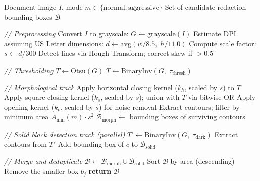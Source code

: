 \begin{algorithm}[t]
  \caption{Redaction Region Detection}
  \label{alg:redaction_detection}
\begin{minipage}{\columnwidth}
\begin{algorithmic}
   Document image $I$, mode $m \in \{\text{normal}, \text{aggressive}\}$
   Set of candidate redaction bounding boxes $\mathcal{B}$

  \STATE \textit{// Preprocessing}
  \STATE Convert $I$ to grayscale: $G \leftarrow \text{grayscale}(I)$
  \STATE Estimate DPI assuming US Letter dimensions: $d \leftarrow \text{avg}(w/8.5,\; h/11.0)$
  \STATE Compute scale factor: $s \leftarrow d / 300$
    \STATE Detect lines via Hough Transform; correct skew if $> 0.5^{\circ}$
  \ENDIF

  \STATE \textit{// Thresholding}
    \STATE $T \leftarrow \text{Otsu}(G)$
  \ELSE
    \STATE $T \leftarrow \text{BinaryInv}(G,\; \tau_{\text{thresh}})$
  \ENDIF

  \STATE \textit{// Morphological track}
  \STATE Apply horizontal closing kernel ($k_h$, scaled by $s$) to $T$
    \STATE Apply square closing kernel ($k_s$, scaled by $s$); union with $T$ via bitwise OR
  \ENDIF
  \STATE Apply opening kernel ($k_o$, scaled by $s$) for noise removal
  \STATE Extract contours; filter by minimum area $A_{\min}(m) \cdot s^2$
  \STATE $\mathcal{B}_{\text{morph}} \leftarrow$ bounding boxes of surviving contours

  \STATE \textit{// Solid black detection track (parallel)}
  \STATE $T' \leftarrow \text{BinaryInv}(G,\; \tau_{\text{dark}})$
  \STATE Extract contours from $T'$
      \STATE Add bounding box of $c$ to $\mathcal{B}_{\text{solid}}$
    \ENDIF
  \ENDFOR

  \STATE \textit{// Merge and deduplicate}
  \STATE $\mathcal{B} \leftarrow \mathcal{B}_{\text{morph}} \cup \mathcal{B}_{\text{solid}}$
  \STATE Sort $\mathcal{B}$ by area (descending)
      \STATE Remove the smaller box $b_j$
    \ENDIF
  \ENDFOR
  \STATE \textbf{return} $\mathcal{B}$
\end{algorithmic}
\end{minipage}
\end{algorithm}


